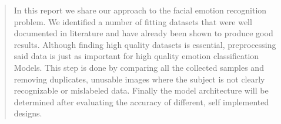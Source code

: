 \begin{abstract}
    In this report we share our approach to the facial emotion 
    recognition problem. We identified a number of fitting datasets 
    that were well documented in literature and have already been shown
    to produce good results. Although finding high quality datasets is 
    essential, preprocessing said data is just as important for high 
    quality emotion classification Models. This step is done by comparing 
    all the collected samples and removing duplicates, unusable images where 
    the subject is not clearly recognizable or mislabeled data. Finally the 
    model architecture will be determined after evaluating the accuracy of 
    different, self implemented designs.
\end{abstract}